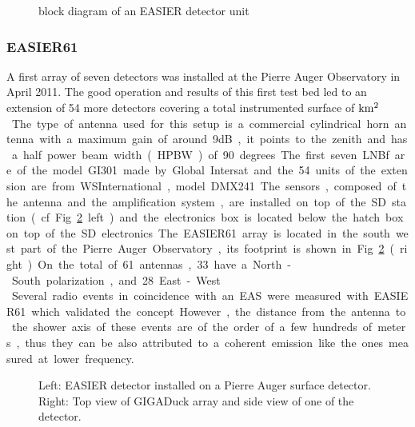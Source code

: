 \begin{figure}[!ht]
  \centering
  \hspace*{-3ex}  
  \caption{block diagram of an EASIER detector unit}
  \label{fig:diagram}  
\end{figure}

\subsubsection*{EASIER61}
A first  array of  seven detectors was  installed at the  Pierre Auger
Observatory  in April  2011.  The  good operation  and results  of this
first test  bed led to an  extension of 54 more  detectors covering a total
instrumented surface  of \unit[91]{$\rm km^2$}.  The  type of antenna used for
this setup  is a  commercial cylindrical horn  antenna with  a maximum
gain of around 9dB, it points to  the zenith and has a half power beam
width (HPBW)  of 90 degrees. The  first seven LNBf are  of the model GI301
made by Global Intersat and  the 54 units of the extension are from
WSInternational, model DMX241. The sensors, composed of the antenna and
the amplification system,  are installed on top of  the SD station (cf
Fig.~\ref{fig:detector} left) and the electronics box is located below
the hatch  box on top  of the SD  electronics.  The EASIER61  array is
located in  the south west part  of the Pierre  Auger Observatory, its
footprint is  shown in Fig.~\ref{fig:detector} (right).   On the total
of  61   antennas,  33  have   a  North-South  polarization,   and  28
East-West.\\ Several radio events in coincidence with an  EAS were measured  with EASIER61 which validated the concept. However, the distance from the antenna to the shower axis of these events are of the order of a few hundreds of meters, thus they can be also attributed to a coherent emission like the ones measured at lower frequency.
\begin{figure}[!ht]
  \centering
  \hspace*{-3ex}  
  \caption{Left: EASIER  detector installed on a  Pierre Auger surface
    detector. Right: Top  view of GIGADuck array  and side view  of one of
    the detector.}
  \label{fig:detector}  
\end{figure}

